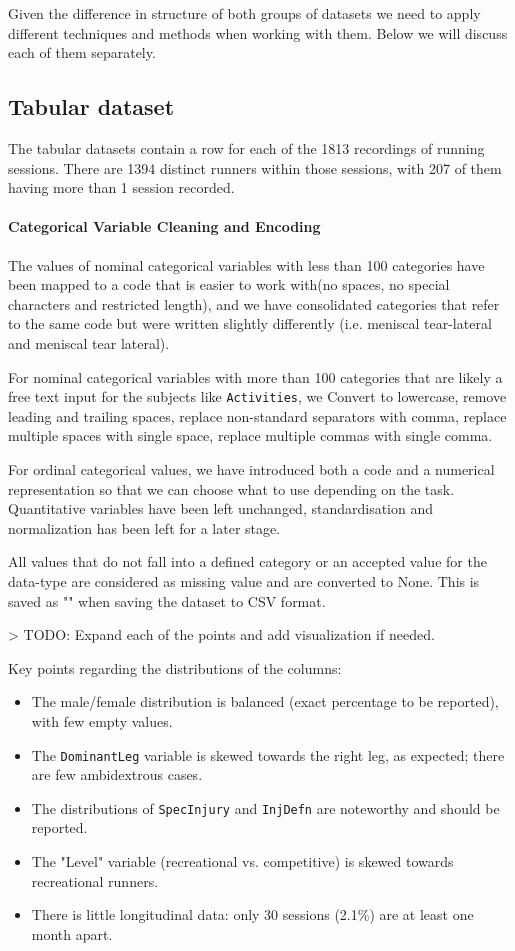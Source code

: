 Given the difference in structure of both groups of datasets we need to apply different techniques and methods when working with them. Below we will discuss each of them separately.

\subsection{Tabular dataset}\label{subsec:method-tabular-dataset}
The tabular datasets contain a row for each of the 1813 recordings of running sessions. There are 1394 distinct runners within those sessions, with 207 of them having more than 1 session recorded.

\paragraph{Categorical Variable Cleaning and Encoding}
The values of nominal categorical variables with less than 100 categories have been mapped to a code that is easier to work with(no spaces, no special characters and restricted length), and we have consolidated categories that refer to the same code but were written slightly differently (i.e. meniscal tear-lateral and meniscal tear lateral).

For nominal categorical variables with more than 100 categories that are likely a free text input for the subjects like \texttt{Activities}, we Convert to lowercase, remove leading and trailing spaces, replace non-standard separators with comma, replace multiple spaces with single space, replace multiple commas with single comma.

For ordinal categorical values, we have introduced both a code and a numerical representation so that we can choose what to use depending on the task.
Quantitative variables have been left unchanged, standardisation and normalization has been left for a later stage.

All values that do not fall into a defined category or an accepted value for the data-type are considered as missing value and are converted to None. This is saved as "" when saving the dataset to CSV format.

> TODO: Expand each of the points and add visualization if needed.

Key points regarding the distributions of the columns:
\begin{itemize}
    \item The male/female distribution is balanced (exact percentage to be reported), with few empty values.
    \item The \texttt{DominantLeg} variable is skewed towards the right leg, as expected; there are few ambidextrous cases.
    \item The distributions of \texttt{SpecInjury} and \texttt{InjDefn} are noteworthy and should be reported.
    \item The "Level" variable (recreational vs. competitive) is skewed towards recreational runners.
    \item There is little longitudinal data: only 30 sessions (2.1\%) are at least one month apart.
\end{itemize}

